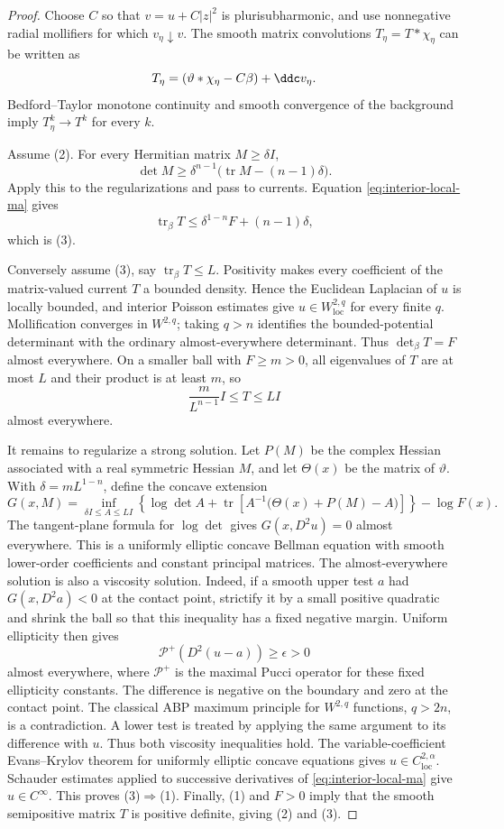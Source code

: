 \begin{proof}
Choose $C$ so that $v=u+C|z|^2$ is plurisubharmonic, and use nonnegative radial mollifiers for which $v_\eta\downarrow v$. The smooth matrix convolutions $T_\eta=T*\chi_\eta$ can be written as
\[
  T_\eta=(\vartheta*\chi_\eta-C\beta)+\ddc v_\eta.
\]
Bedford--Taylor monotone continuity and smooth convergence of the background imply $T_\eta^k\to T^k$ for every $k$.

Assume (2). For every Hermitian matrix $M\geq\delta I$,
\[
  \det M\geq\delta^{n-1}\bigl(\operatorname{tr} M-(n-1)\delta\bigr).
\]
Apply this to the regularizations and pass to currents. Equation \eqref{eq:interior-local-ma} gives
\[
  \operatorname{tr}_\beta T\leq\delta^{1-n}F+(n-1)\delta,
\]
which is (3).

Conversely assume (3), say $\operatorname{tr}_\beta T\leq L$. Positivity makes every coefficient of the matrix-valued current $T$ a bounded density. Hence the Euclidean Laplacian of $u$ is locally bounded, and interior Poisson estimates give $u\in W^{2,q}_{\mathrm{loc}}$ for every finite $q$. Mollification converges in $W^{2,q}$; taking $q>n$ identifies the bounded-potential determinant with the ordinary almost-everywhere determinant. Thus $\det_\beta T=F$ almost everywhere. On a smaller ball with $F\geq m>0$, all eigenvalues of $T$ are at most $L$ and their product is at least $m$, so
\[
  \frac{m}{L^{n-1}}I\leq T\leq LI
\]
almost everywhere.

It remains to regularize a strong solution. Let $P(M)$ be the complex Hessian associated with a real symmetric Hessian $M$, and let $\Theta(x)$ be the matrix of $\vartheta$. With $\delta=mL^{1-n}$, define the concave extension
\[
  G(x,M)=\inf_{\delta I\leq A\leq LI}
  \left\{\log\det A+\operatorname{tr}\!\left[A^{-1}\bigl(\Theta(x)+P(M)-A\bigr)\right]\right\}-\log F(x).
\]
The tangent-plane formula for $\log\det$ gives $G(x,D^2u)=0$ almost everywhere. This is a uniformly elliptic concave Bellman equation with smooth lower-order coefficients and constant principal matrices. The almost-everywhere solution is also a viscosity solution. Indeed,
if a smooth upper test $a$ had $G(x,D^2a)<0$ at the contact point,
strictify it by a small positive quadratic and shrink the ball so that
this inequality has a fixed negative margin. Uniform ellipticity then
gives
\[
 \mathcal P^+(D^2(u-a))\geq\epsilon>0
\]
almost everywhere, where $\mathcal P^+$ is the maximal Pucci operator
for these fixed ellipticity constants. The difference is negative on
the boundary and zero at the contact point. The classical ABP maximum
principle for $W^{2,q}$ functions, $q>2n$, is a contradiction. A lower
test is treated by applying the same argument to its difference with
$u$. Thus both viscosity inequalities hold. The variable-coefficient
Evans--Krylov theorem for uniformly elliptic concave equations
\cite{Caffarelli89} gives $u\in C^{2,\alpha}_{\mathrm{loc}}$. Schauder estimates applied to successive derivatives of \eqref{eq:interior-local-ma} give $u\in C^\infty$. This proves (3)$\Rightarrow$(1). Finally, (1) and $F>0$ imply that the smooth semipositive matrix $T$ is positive definite, giving (2) and (3).
\end{proof}

